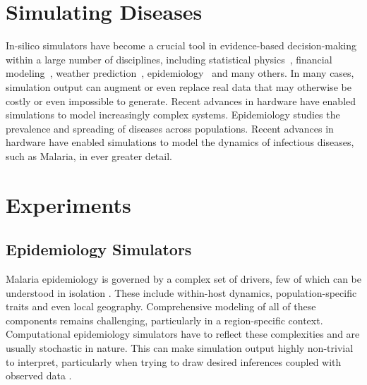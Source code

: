 \documentclass{article}
\begin{document}
\section{Simulating Diseases}
 \label{sec:background}


In-silico simulators have become a crucial tool in evidence-based decision-making within a large number of disciplines, including statistical physics~\cite{landau_binder_2014}, financial modeling~\cite{jackel2002monte},
weather prediction~\cite{evensen1994sequential}, epidemiology~\cite{smith2008towards} and many others.
In many cases, simulation output can augment or even replace real data that may otherwise be costly or even impossible to generate.
Recent advances in hardware have enabled simulations to model increasingly complex systems.
Epidemiology studies the prevalence and spreading of diseases across populations. Recent advances in hardware have enabled simulations to model the dynamics of infectious diseases, such as Malaria, in ever greater detail.

\section{Experiments}
\subsection{Epidemiology Simulators}

Malaria epidemiology is governed by a complex set of drivers, 
few of which can be understood in isolation \cite{cameron2015defining,autino_epidemiology_2012,smith2008towards,bershteyn2018implementation}.
These include within-host dynamics, population-specific traits and even local geography.
Comprehensive modeling of all of these components remains challenging, particularly in a region-specific context. 
Computational epidemiology simulators have to reflect these complexities and are usually stochastic in nature. This can make simulation output highly non-trivial to interpret, particularly when trying to draw desired inferences coupled with observed data \cite{mwendera_challenges_2019,ferris_openmalaria_2015}.
\end{document}
